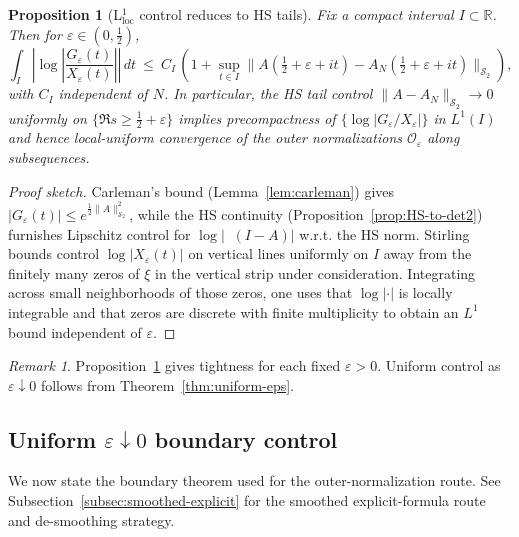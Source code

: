 \documentclass[11pt]{article}
\newtheorem{proposition}[theorem]{Proposition}
\theoremstyle{remark}
\newtheorem{remark}[theorem]{Remark}
\newcommand{\HS}{\mathcal{S}_2}
\DeclareMathOperator{\dettwo}{det_2}
\begin{document}
\begin{proposition}[L$^1_{\mathrm{loc}}$ control reduces to HS tails]\label{prop:L1loc}
Fix a compact interval $I\subset\mathbb R$. Then for $\varepsilon\in(0,\tfrac12)$,
\[
 \int_{I}\left|\log\left|\frac{G_{\varepsilon}(t)}{X_{\varepsilon}(t)}\right|\right|\,dt\ \le\ C_I\,\left(1+\sup_{t\in I}\|A(\tfrac12+\varepsilon+it)-A_N(\tfrac12+\varepsilon+it)\|_{\HS}\right),
\]
with $C_I$ independent of $N$. In particular, the HS tail control $\|A-A_N\|_{\HS}\to 0$ uniformly on $\{\Re s\ge \tfrac12+\varepsilon\}$ implies precompactness of $\{\log|G_{\varepsilon}/X_{\varepsilon}|\}$ in $L^1(I)$ and hence local-uniform convergence of the outer normalizations $\mathcal O_{\varepsilon}$ along subsequences.
\end{proposition}
\begin{proof}[Proof sketch]
Carleman’s bound (Lemma~\ref{lem:carleman}) gives $|G_{\varepsilon}(t)|\le e^{\tfrac12\|A\|_{\HS}^2}$, while the HS continuity (Proposition~\ref{prop:HS-to-det2}) furnishes Lipschitz control for $\log|\dettwo(I-A)|$ w.r.t. the HS norm. Stirling bounds control $\log|X_{\varepsilon}(t)|$ on vertical lines uniformly on $I$ away from the finitely many zeros of $\xi$ in the vertical strip under consideration. Integrating across small neighborhoods of those zeros, one uses that $\log|\cdot|$ is locally integrable and that zeros are discrete with finite multiplicity to obtain an $L^1$ bound independent of $\varepsilon$.
\end{proof}

\begin{remark}
Proposition~\ref{prop:L1loc} gives tightness for each fixed $\varepsilon>0$. Uniform control as $\varepsilon\downarrow 0$ follows from Theorem~\ref{thm:uniform-eps}.
\end{remark}

\subsection{Uniform $\varepsilon\downarrow 0$ boundary control}\label{subsec:uniform-eps}
We now state the boundary theorem used for the outer-normalization route. See Subsection~\ref{subsec:smoothed-explicit} for the smoothed explicit-formula route and de-smoothing strategy.
\end{document}

